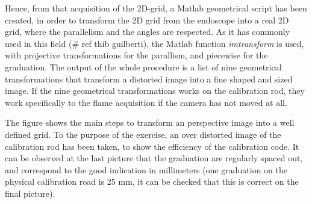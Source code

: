Hence, from that acquisition of the 2D-grid, a Matlab geometrical script has been created, in order to transform the 2D grid from the endoscope into a real 2D grid, where the parallelism and the angles are respected. As it has commonly used in this field (\# ref thib guilberti), the Matlab function \textit{imtransform} is used, with projective transformations for the parallism, and piecewise for the graduation. The output of the whole procedure is a list of nine geometrical transformations that transform a distorted image into a fine shaped and sized image. If the nine geometrical transformations works on the calibration rod, they work specifically to the flame acquisition if the camera has not moved at all. 


The figure shows the main steps to transform an perspective image into a well defined grid. To the purpose of the exercise, an over distorted image of the calibration rod has been taken, to show the efficiency of the calibration code. It can be observed at the last picture that the graduation are regularly spaced out, and correspond to the good indication in millimeters (one graduation on the physical calibration road is 25 mm, it can be checked that this is correct on the final picture).


